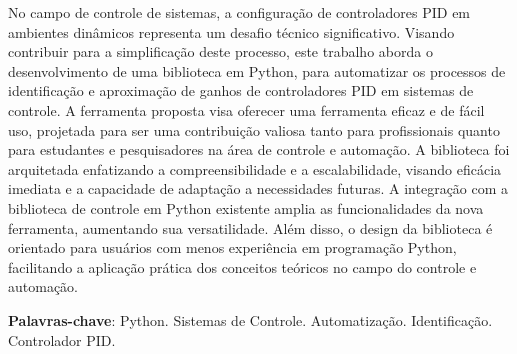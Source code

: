 \documentclass[
	12pt,				%
	openright,			%
	oneside,			%
	a4paper,			%
	english,			%
	french,				%
	spanish,			%
	brazil				%
	]{abntex2}
\begin{document}
\setlength{\absparsep}{18pt} %
\renewcommand{\baselinestretch}{1} 
\begin{resumo}
    No campo de controle de sistemas, a configuração de controladores PID em ambientes dinâmicos representa um desafio
    técnico significativo.
    Visando contribuir para a simplificação deste processo, este trabalho aborda o desenvolvimento de uma biblioteca em
    Python, para automatizar os processos de identificação e aproximação de ganhos de controladores PID em sistemas de
    controle.
    A ferramenta proposta visa oferecer uma ferramenta eficaz e de fácil uso, projetada para ser uma contribuição
    valiosa tanto para profissionais quanto para estudantes e pesquisadores na área de controle e automação.
    A biblioteca foi arquitetada enfatizando a compreensibilidade e a escalabilidade, visando eficácia imediata e a
    capacidade de adaptação a necessidades futuras.
    A integração com a biblioteca de controle em Python existente amplia as funcionalidades da nova ferramenta,
    aumentando sua versatilidade.
    Além disso, o design da biblioteca é orientado para usuários com menos experiência em programação Python,
    facilitando a aplicação prática dos conceitos teóricos no campo do controle e automação.
 
   \noindent 
    \textbf{Palavras-chave}: Python. Sistemas de Controle. Automatização. Identificação. Controlador PID.
\end{resumo}
\end{document}
